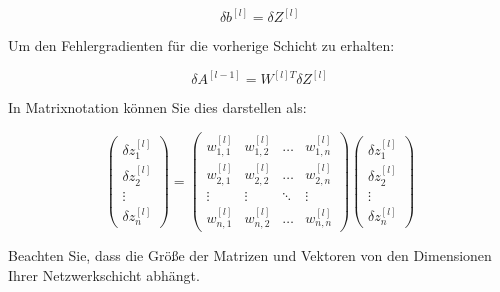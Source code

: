 \begin{equation}
\delta b^{[l]} = \delta Z^{[l]}
\end{equation}

Um den Fehlergradienten für die vorherige Schicht zu erhalten:

\begin{equation}
\delta A^{[l-1]} = W^{[l]T} \delta Z^{[l]}
\end{equation}

In Matrixnotation können Sie dies darstellen als:

\begin{equation}
\begin{pmatrix}
\delta z_{1}^{[l]} \\
\delta z_{2}^{[l]} \\
\vdots \\
\delta z_{n}^{[l]}
\end{pmatrix}
=
\begin{pmatrix}
w_{1,1}^{[l]} & w_{1,2}^{[l]} & \dots & w_{1,n}^{[l]} \\
w_{2,1}^{[l]} & w_{2,2}^{[l]} & \dots & w_{2,n}^{[l]} \\
\vdots & \vdots & \ddots & \vdots \\
w_{n,1}^{[l]} & w_{n,2}^{[l]} & \dots & w_{n,n}^{[l]}
\end{pmatrix}
\begin{pmatrix}
\delta z_{1}^{[l]} \\
\delta z_{2}^{[l]} \\
\vdots \\
\delta z_{n}^{[l]}
\end{pmatrix}
\end{equation}

Beachten Sie, dass die Größe der Matrizen und Vektoren von den Dimensionen Ihrer Netzwerkschicht abhängt.
